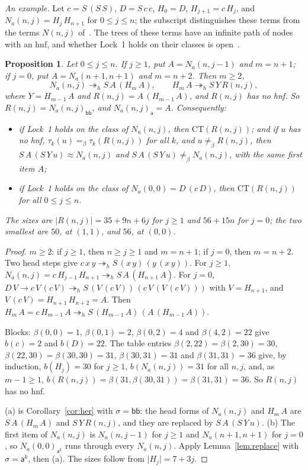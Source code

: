 \documentclass[11pt]{amsart}
\newtheorem{proposition}[theorem]{Proposition}
\theoremstyle{definition}
\newcommand{\hred}{\twoheadrightarrow_h}
\newcommand{\conv}{=_\beta}
\newcommand{\nconv}{\neq_\beta}
\newcommand{\sz}[1]{\lvert#1\rvert}
\newcommand{\la}{\mathsf a}
\newcommand{\lb}{\mathsf b}
\newcommand{\CT}{\mathrm{CT}}
\begin{document}
\emph{An example.} Let $c=S\,(S\,S)$, $D=S\,c\,c$, $H_0=D$, $H_{j+1}=c\,H_j$, and $N_a(n,j)=H_j\,H_{n+1}$
for $0\le j\le n$; the subscript distinguishes these terms from the terms $N(n,j)$ of~\citep{s14}.
The trees of these terms have an infinite path of nodes with an hnf, and whether Lock~1 holds on
their classes is open~\citep[Remark~9]{s14}.

\begin{proposition}\label{prop:afam}
Let $0\le j\le n$. If $j\ge1$, put $A=N_a(n,j-1)$ and $m=n+1$; if $j=0$, put $A=N_a(n+1,n+1)$ and
$m=n+2$. Then $m\ge2$,
\[
N_a(n,j)\hred S\,A\,(H_m\,A),\qquad H_m\,A\hred S\,Y\,R(n,j),
\]
where $Y=H_{m-1}\,A$ and $R(n,j)=A\,(H_{m-1}\,A)$, and $R(n,j)$ has no hnf. So $R(n,j)=N_a(n,j)_{\lb\lb}$,
and $N_a(n,j)_\la=A$. Consequently:
\begin{itemize}
\item[(a)] if Lock~1 holds on the class of $N_a(n,j)$, then $\CT(R(n,j))$; and if $u$ has no hnf,
  $\tau_k(u)\conv\tau_k(R(n,j))$ for all $k$, and $u\nconv R(n,j)$, then $S\,A\,(S\,Y\,u)\approx
  N_a(n,j)$ and $S\,A\,(S\,Y\,u)\nconv N_a(n,j)$, with the same first item $A$;
\item[(b)] if Lock~1 holds on the class of $N_a(0,0)=D\,(c\,D)$, then $\CT(R(n,j))$ for all $0\le j\le n$.
\end{itemize}
The sizes are $\sz{R(n,j)}=35+9n+6j$ for $j\ge1$ and $56+15n$ for $j=0$; the two smallest are $50$, at
$(1,1)$, and $56$, at $(0,0)$.
\end{proposition}

\begin{proof}
$m\ge2$: if $j\ge1$, then $n\ge j\ge1$ and $m=n+1$; if $j=0$, then $m=n+2$. Two head steps give
$c\,x\,y\hred S\,(x\,y)\,(y\,(x\,y))$. For $j\ge1$, $N_a(n,j)=c\,H_{j-1}\,H_{n+1}\hred
S\,A\,(H_{n+1}\,A)$. For $j=0$, $D\,V\to c\,V\,(c\,V)\hred S\,(V\,(c\,V))\,(c\,V\,(V\,(c\,V)))$ with
$V=H_{n+1}$, and $V\,(c\,V)=H_{n+1}\,H_{n+2}=A$. Then $H_m\,A=c\,H_{m-1}\,A\hred
S\,(H_{m-1}\,A)\,(A\,(H_{m-1}\,A))$.

Blocks: $\beta(0,0)=1$, $\beta(0,1)=2$, $\beta(0,2)=4$ and $\beta(4,2)=22$ give $b(c)=2$ and
$b(D)=22$. The table entries $\beta(2,22)=\beta(2,30)=30$, $\beta(22,30)=\beta(30,30)=31$,
$\beta(30,31)=31$ and $\beta(31,31)=36$ give, by induction, $b(H_j)=30$ for $j\ge1$,
$b(N_a(n,j))=31$ for all $n,j$, and, as $m-1\ge1$, $b(R(n,j))=\beta(31,\beta(30,31))=\beta(31,31)=36$.
So $R(n,j)$ has no hnf.

(a) is Corollary~\ref{cor:her} with $\sigma=\lb\lb$: the head forms of $N_a(n,j)$ and $H_m\,A$ are
$S\,A\,(H_m\,A)$ and $S\,Y\,R(n,j)$, and they are replaced by $S\,A\,(S\,Y\,u)$. (b) The first item of
$N_a(n,j)$ is $N_a(n,j-1)$ for $j\ge1$ and $N_a(n+1,n+1)$ for $j=0$, so $N_a(0,0)_{\la^k}$ runs through
every $N_a(n,j)$. Apply Lemma~\ref{lem:replace} with $\sigma=\la^k$, then (a). The sizes follow from
$\sz{H_j}=7+3j$.
\end{proof}
\end{document}
